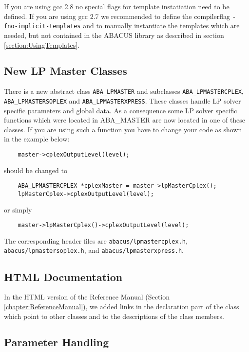 If you are using gcc 2.8 no special flags for template instatiation need to be
defined. If you are using gcc 2.7 we recommended to define the compilerflag
{\tt -fno-implicit-templates} and to manually instantiate the templates
which are needed, but not contained in the ABACUS library as described in
section \ref{section:UsingTemplates}.


\subsection{New LP Master Classes}

There is a new abstract class {\tt ABA\_LPMASTER} and subclasses
{\tt ABA\_LPMASTERCPLEX}, {\tt ABA\_LPMASTERSOPLEX} and {\tt ABA\_LPMASTERXPRESS}.
These classes handle LP solver
specific parameters and global data. As a consequence some LP solver specific
functions which were located in ABA\_MASTER are now located in one of these
classes. If you are using such a function you have to change your code as
shown in the example below:
\begin{verbatim}
    master->cplexOutputLevel(level);
\end{verbatim}
should be changed to
\begin{verbatim}
    ABA_LPMASTERCPLEX *cplexMaster = master->lpMasterCplex();
    lpMasterCplex->cplexOutputLevel(level);
\end{verbatim}
or simply
\begin{verbatim}
    master->lpMasterCplex()->cplexOutputLevel(level);
\end{verbatim}

\begin{sloppypar}
The corresponding header files are {\tt abacus/lpmastercplex.h}, 
{\tt abacus/lpmastersoplex.h}, and {\tt abacus/lpmasterxpress.h}.
\end{sloppypar}

\subsection{HTML Documentation}

In the HTML version of the Reference Manual 
(Section \ref{chapter:ReferenceManual}), we added links in
the declaration part of the class which point to other classes
and to the descriptions of the class members.


\subsection{Parameter Handling}
 
